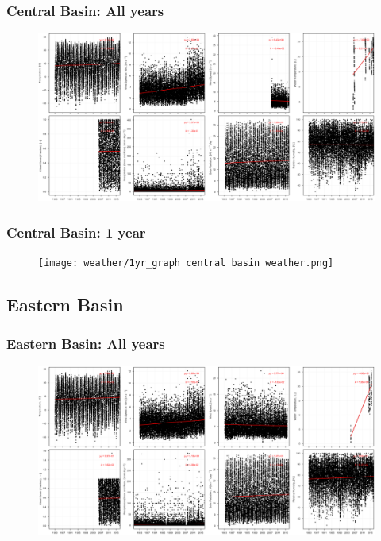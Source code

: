 \documentclass{beamer}
\begin{document}
\begin{frame}
\frametitle{Central Basin: All years}
\begin{figure}
\includegraphics[width=\textwidth]{weather/all_years central basin weather.png}
\end{figure}
\end{frame}

\begin{frame}
\frametitle{Central Basin: 1 year}
\begin{figure}
\texttt{[image: weather/1yr\_graph  central basin weather.png]}
\end{figure}
\end{frame}


\subsection{Eastern Basin}

\begin{frame}
\frametitle{Eastern Basin: All years}
\begin{figure}
\includegraphics[width=\textwidth]{weather/all_years eastern basin weather.png}
\end{figure}
\end{frame}
\end{document}
